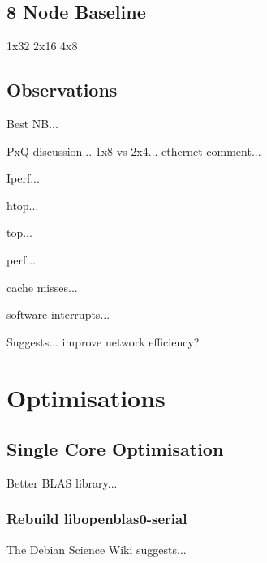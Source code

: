 \documentclass{article}
\begin{document}


\subsection{8 Node Baseline}

1x32
2x16
4x8




\subsection{Observations}

Best NB...

PxQ discussion... 1x8 vs 2x4... ethernet comment...

Iperf...

htop...

top...

perf...

cache misses...

software interrupts...

Suggests... improve network efficiency?



%
%
\clearpage\section{Optimisations}

%
%
\subsection{Single Core Optimisation}

Better BLAS library...

\subsubsection{Rebuild libopenblas0-serial}

The Debian Science Wiki suggests...
\end{document}
